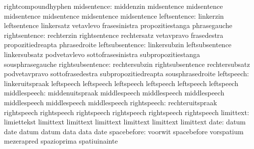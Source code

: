                            rightcompoundhyphen
              midsentence: middenzin                 midsentence
                           midsentence               midsentence
                           midsentence               midsentence
                           midsentence
             leftsentence: linkerzin                 leftsentence
                           linkersatz                vetavlevo
                           frasesinistra             propozitiestanga
                           phrasegauche
            rightsentence: rechterzin                rightsentence
                           rechtersatz               vetavpravo
                           frasedestra               propozitiedreapta
                           phrasedroite
          leftsubsentence: linkersubzin              leftsubsentence
                           linkersubsatz             podvetavlevo
                           sottofrasesinistra        subpropozitiestanga
                           sousphrasegauche
         rightsubsentence: rechtersubzin             rightsubsentence
                           rechtersubsatz            podvetavpravo
                           sottofrasedestra          subpropozitiedreapta
                           sousphrasedroite
               leftspeech: linkeruitspraak           leftspeech
                           leftspeech                leftspeech
                           leftspeech                leftspeech
                           leftspeech
             middlespeech: middenuitspraak           middlespeech
                           middlespeech              middlespeech
                           middlespeech              middlespeech
                           middlespeech
              rightspeech: rechteruitspraak          rightspeech
                           rightspeech               rightspeech
                           rightspeech               rightspeech
                           rightspeech
                limittext: limiettekst               limittext
                           limittext                 limittext
                           limittext                 limittext
                           limittext
                     date: datum                     date
                           datum                     datum
                           data                      data
                           date
              spacebefore: voorwit                   spacebefore
                           vorspatium                mezerapred
                           spazioprima               spatiuinainte

